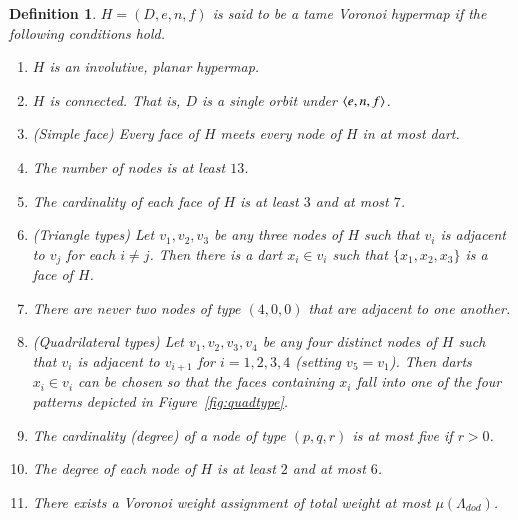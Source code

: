 \documentclass{article} %
\newtheorem{definition}[lemma]{Definition}
\begin{document}
\begin{definition}
$H=(D,e,n,f)$ is said to be a tame Voronoi hypermap if the following conditions
hold.
\begin{enumerate}

\item $H$ is an involutive, planar hypermap.
\item $H$ is connected.  
That is, $D$ is a single orbit under $\langle e,n,f\rangle$.
\item (Simple face) Every face of $H$ meets every node of $H$ in at most
dart.

\label{def:tame6}
\item The number of nodes is at least $13$.

\item The cardinality of each face of $H$ is at least $3$ and at most $7$.
\label{def:tame1}

\item 
\label{def:tame2}
(Triangle types) 
Let $v_1,v_2,v_3$ be any three nodes of $H$ such that $v_i$ is adjacent to $v_j$
for each $i\ne j$.  Then there is a dart $x_i\in v_i$ such that $\{x_1,x_2,x_3\}$ is
a face of $H$.

\label{def:tame8}
\item There are never two nodes of type $(4,0,0)$ that are adjacent to one another.


\item
\label{def:tame3}
(Quadrilateral types) 
Let $v_1,v_2,v_3,v_4$ be any four distinct nodes of $H$ such that $v_i$ is adjacent
to $v_{i+1}$ for $i=1,2,3,4$ (setting $v_5=v_1$).  Then darts $x_i\in v_i$ can be chosen
so that the faces containing $x_i$ fall into one of the four patterns depicted
in Figure~\ref{fig:quadtype}.

\item 
\label{def:tame4}
The cardinality (degree) of a node of type $(p,q,r)$ is at most five if $r>0$.


\item 
\label{def:tame5}
The degree of each node of $H$ is at least $2$ and at most $6$.




\label{def:tame7}
\item There exists a Voronoi weight assignment of total weight at most $\mu(\Lambda_{dod})$.

\end{enumerate}
\end{definition}
\end{document}
